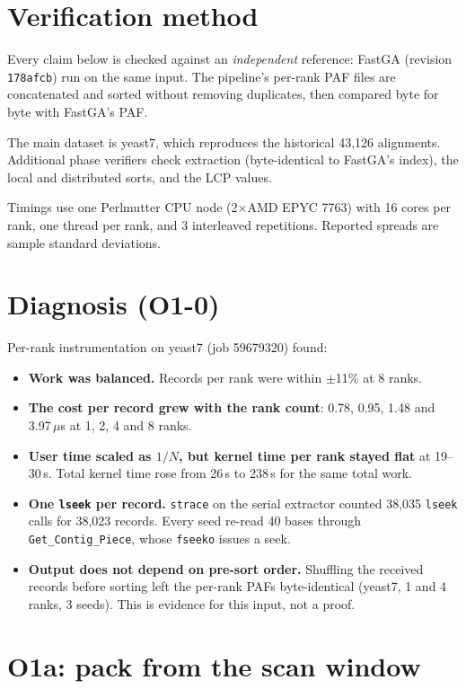 \documentclass[sigconf,nonacm]{acmart}
\begin{document}
\section{Verification method}

Every claim below is checked against an \emph{independent} reference: FastGA
(revision \texttt{178afcb}) run on the same input. The pipeline's per-rank PAF
files are concatenated and sorted without removing duplicates, then compared
byte for byte with FastGA's PAF.

The main dataset is yeast7, which reproduces the historical 43,126
alignments. Additional phase verifiers check extraction (byte-identical to
FastGA's index), the local and distributed sorts, and the LCP values.

Timings use one Perlmutter CPU node (2$\times$AMD EPYC 7763) with 16 cores per
rank, one thread per rank, and 3 interleaved repetitions. Reported spreads are
sample standard deviations.

\section{Diagnosis (O1-0)}

Per-rank instrumentation on yeast7 (job 59679320) found:

\begin{itemize}
\item \textbf{Work was balanced.} Records per rank were within $\pm$11\% at 8
ranks.
\item \textbf{The cost per record grew with the rank count}: 0.78, 0.95, 1.48
and 3.97\,$\mu$s at 1, 2, 4 and 8 ranks.
\item \textbf{User time scaled as $1/N$, but kernel time per rank stayed
flat} at 19--30\,s. Total kernel time rose from 26\,s to 238\,s for the same
total work.
\item \textbf{One \texttt{lseek} per record.} \texttt{strace} on the serial
extractor counted 38,035 \texttt{lseek} calls for 38,023 records. Every seed
re-read 40 bases through \texttt{Get\_Contig\_Piece}, whose \texttt{fseeko}
issues a seek.
\item \textbf{Output does not depend on pre-sort order.} Shuffling the
received records before sorting left the per-rank PAFs byte-identical (yeast7,
1 and 4 ranks, 3 seeds). This is evidence for this input, not a proof.
\end{itemize}

\section{O1a: pack from the scan window}
\end{document}
